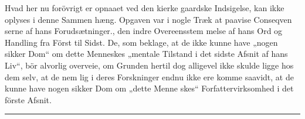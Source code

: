 \documentclass[12pt,a4paper]{article}
\begin{document}
Hvad her nu forövrigt er opnaaet ved den kierke\-%
gaardske Indsigelse, kan ikke oplyses i denne Sammen\-%
hæng. Opgaven var i nogle Træk at paavise Conseqven\-%
serne af hans Forudsætninger., den indre Overeensstem\-%
melse af hans Ord og Handling fra Först til Sidst. De,
som beklage, at de ikke kunne have „nogen sikker Dom“
om dette Menneskes „mentale Tilstand i det sidste Afsnit
af hans Liv“, bör alvorlig overveie, om Grunden hertil
dog alligevel ikke skulde ligge hos dem selv, at de nem\-%
lig i deres Forskninger endnu ikke ere komme saavidt,
at de kunne have nogen sikker Dom om „dette Menne\-%
skes“ Forfattervirksomhed i det förste Afsnit.

\begin{center}\rule{0.25\linewidth}{0.4pt}\end{center}
\end{document}
